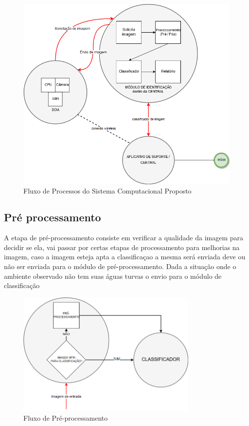 \begin{figure}[ht]
	\centering
    \caption{\label{fig:fluxoprocesso}Fluxo de Processos do Sistema Computacional Proposto}
	\includegraphics[width = 1\textwidth]{resources/fluxo-de-processo.png}
\end{figure}

\subsection{Pré processamento}
A etapa de pré-processamento consiste em verificar a qualidade da imagem para decidir se ela, vai passar por certas etapas de processamento para melhorias na imagem, caso a imagem esteja apta a classificaçao a mesma será enviada  deve ou não ser enviada para o módulo de pré-processamento. Dada a situação onde o ambiente observado não tem suas águas turvas o envio para o módulo de classificação


\begin{figure}[ht]
	\centering
    \caption{\label{fig:bigpic}Fluxo de Pré-processamento}
	\includegraphics[width = 0.8\textwidth]{resources/fluxoprocessamento.png}
\end{figure}

